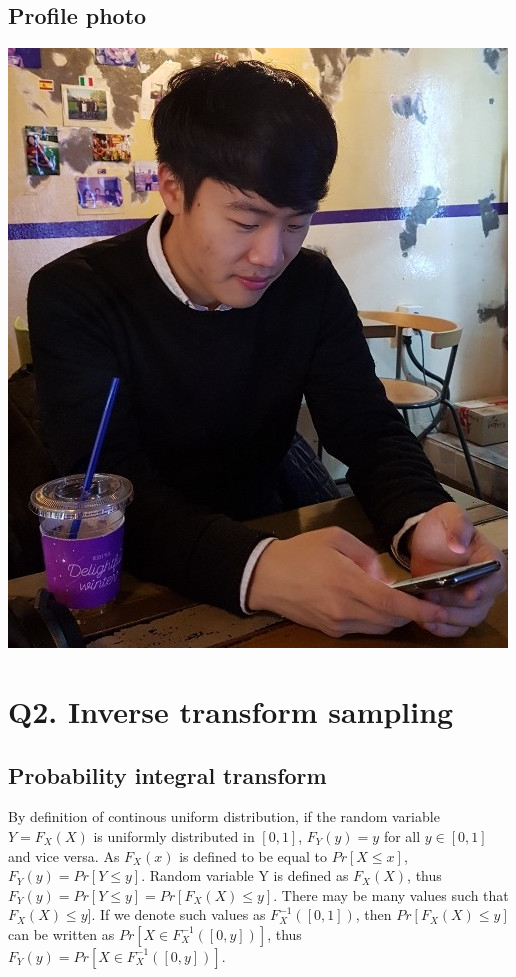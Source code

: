 \documentclass{article}
\begin{document}
\subsection{Profile photo}
  \begin{center}
    \includegraphics[scale=0.25]{profile_picture}
  \end{center}

\section{Q2. Inverse transform sampling}
\subsection{Probability integral transform}
By definition of continous uniform distribution, if the random variable $Y = F_X(X)$ is uniformly distributed in $[0, 1]$, $F_Y(y) = y$ for all $y \in [0, 1]$ and vice versa.
As $F_X(x)$ is defined to be equal to $Pr[X \leq x]$, $F_Y(y) = Pr[Y \leq y]$. Random variable Y is defined as $F_X(X)$, thus
$F_Y(y) = Pr[Y \leq y] = Pr[F_X(X) \leq y]$. There may be many values such that $F_X(X) \leq y]$. If we denote such values as $F_X^{-1}([0, 1])$, then $Pr[F_X(X) \leq y]$
can be written as $Pr[X \in F_X^{-1}([0, y])]$, thus $F_Y(y) = Pr[X \in F_X^{-1}([0, y])]$.
\end{document}
